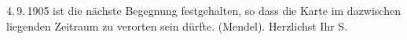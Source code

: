 \begin{ledgroupsized}[t]{13cm}
{{{{{                           4. 9. 1905
                        ist die nächste Begegnung festgehalten, so dass die Karte im dazwischen
                        liegenden Zeitraum zu verorten sein dürfte. }}}\label{K_L03411-1h} (Mendel).}}\pend
           \pstart
           Herzlichst Ihr \spacefill\mbox{S.}\pend
           
         
         \endnumbering{}\end{ledgroupsized}\begin{anhang}\end{anhang}\newcommand{\dateiname}{L03411}\newcommand{\titel}{Felix Salten an Arthur Schnitzler, [zwischen 25. 8. und 3. 9. 1905?]}\newcommand{\editorInnen}{Martin Anton Müller und Laura Untner}
      